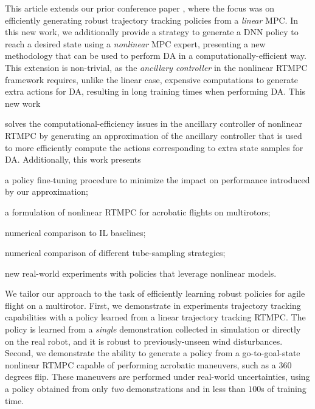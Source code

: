 This article extends our prior conference paper \cite{tagliabue2022efficient}, where the focus was on efficiently generating robust trajectory tracking policies from a \textit{linear} \ac{MPC}. In this new work, we additionally provide a strategy to generate a \ac{DNN} policy to reach a desired state using a \textit{nonlinear} \ac{MPC} expert, presenting a new methodology that can be used to perform \ac{DA} in a computationally-efficient way. 
This extension is non-trivial, as the \textit{ancillary controller} in the nonlinear \ac{RTMPC} framework requires, unlike the linear case, expensive computations to generate extra actions for \ac{DA}, resulting in long training times when performing \ac{DA}. This new work 
\begin{inparaenum}[(i)]
    \item solves the computational-efficiency issues in the ancillary controller of nonlinear \ac{RTMPC} by generating an approximation of the ancillary controller that is used to more efficiently compute the actions corresponding to extra state samples for \ac{DA}. Additionally, this work presents
    \item a policy fine-tuning procedure to minimize the impact on performance introduced by our approximation;
    \item a formulation of nonlinear \ac{RTMPC} for acrobatic flights on multirotors; 
    \item numerical comparison to \ac{IL} baselines;
    \item numerical comparison of different tube-sampling strategies;
    \item new real-world experiments with policies that leverage nonlinear models. 
\end{inparaenum}

We tailor our approach to the task of efficiently learning robust policies for agile flight on a multirotor. First, we demonstrate in experiments trajectory tracking capabilities with a policy learned from a linear trajectory tracking \ac{RTMPC}. The policy is learned from a \textit{single} demonstration collected in simulation or directly on the real robot, and it is robust to previously-unseen wind disturbances. Second, we demonstrate the ability to generate a policy from a go-to-goal-state nonlinear \ac{RTMPC} capable of performing acrobatic maneuvers, such as a  $360$ degrees flip. These maneuvers are performed under real-world uncertainties, using a policy obtained from only \textit{two} demonstrations and in less than $100$s of training time.




